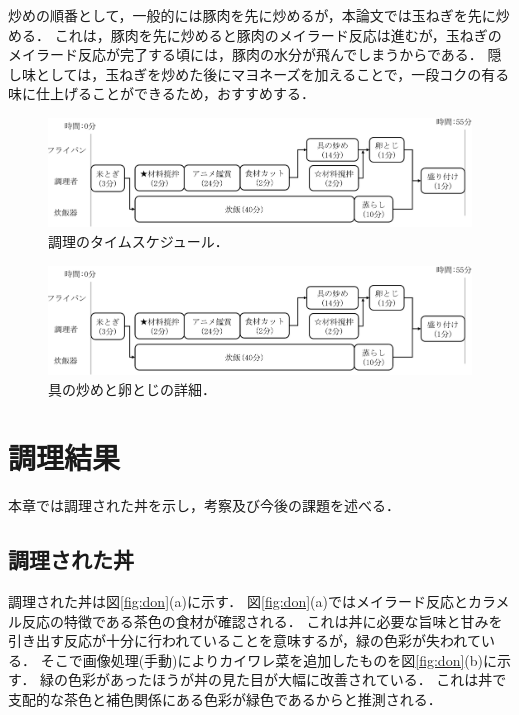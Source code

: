 炒めの順番として，一般的には豚肉を先に炒めるが，本論文では玉ねぎを先に炒める．
これは，豚肉を先に炒めると豚肉のメイラード反応は進むが，玉ねぎのメイラード反応が完了する頃には，豚肉の水分が飛んでしまうからである．
隠し味としては，玉ねぎを炒めた後にマヨネーズを加えることで，一段コクの有る味に仕上げることができるため，おすすめする．


\begin{figure}[ht]
\centering
\includegraphics[page=1, width=16.00000cm]{./fig/fig_bb.pdf}
\caption{調理のタイムスケジュール．\label{fig:time}}
\end{figure}


\begin{figure}[ht]
\centering
\includegraphics[page=2, width=12.00000cm]{./fig/fig_bb.pdf}
\caption{具の炒めと卵とじの詳細．\label{fig:flypan}}
\end{figure}

\clearpage

\section{調理結果}\label{ux8abfux7406ux7d50ux679c}

本章では調理された丼を示し，考察及び今後の課題を述べる．

\subsection{調理された丼}\label{ux8abfux7406ux3055ux308cux305fux4e3c}

調理された丼は図\ref{fig:don}(a)に示す．
図\ref{fig:don}(a)ではメイラード反応とカラメル反応の特徴である茶色の食材が確認される．
これは丼に必要な旨味と甘みを引き出す反応が十分に行われていることを意味するが，緑の色彩が失われている．
そこで画像処理(手動)によりカイワレ菜を追加したものを図\ref{fig:don}(b)に示す．
緑の色彩があったほうが丼の見た目が大幅に改善されている．
これは丼で支配的な茶色と補色関係にある色彩が緑色であるからと推測される．


